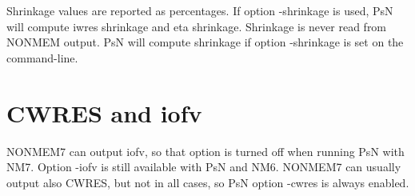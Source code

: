 Shrinkage values are reported as percentages. If option -shrinkage is used, PsN will compute iwres shrinkage and eta shrinkage. 
Shrinkage is never read from NONMEM output. PsN will compute shrinkage if option -shrinkage is set on the command-line.

\section{CWRES and iofv}

NONMEM7 can output iofv, so that option is turned off when running PsN with NM7.
Option -iofv is still available with PsN and NM6.
NONMEM7 can usually output also CWRES, but not in all cases,
so PsN option -cwres is always enabled.


